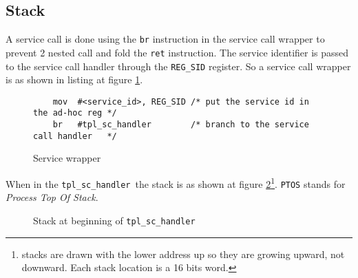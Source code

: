 \documentclass[11pt, oneside]{article}   	%
\newcommand{\sch}{\lstinline{tpl_sc_handler}}
\begin{document}
\subsection{Stack}

A service call is done using the \lstinline{br} instruction in the service call wrapper to prevent 2 nested call and fold the \lstinline{ret} instruction. The service identifier is passed to the service call handler through the \lstinline{REG_SID} register. So a service call wrapper is as shown in listing at figure \ref{lst:wrapper}.

\begin{figure}[h]
\caption{Service wrapper}
\begin{lstlisting}
    mov  #<service_id>, REG_SID /* put the service id in the ad-hoc reg */
    br   #tpl_sc_handler        /* branch to the service call handler   */
\end{lstlisting}
\label{lst:wrapper}
\end{figure}

When in the \sch\ the stack is as shown at figure \ref{fig:stacksc}\footnote{stacks are drawn with the lower address up so they are growing upward, not downward. Each stack location is a 16 bits word.}. \texttt{PTOS} stands for \emph{Process Top Of Stack}.

\begin{figure}[h]
\caption{Stack at beginning of \sch}
\centering
\vspace{1em}
\label{fig:stacksc}
\end{figure}
\end{document}
